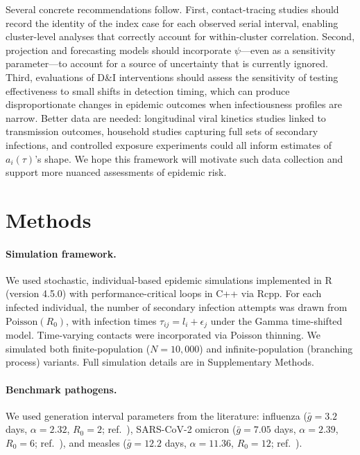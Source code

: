 \documentclass[10pt]{article}
\begin{document}
Several concrete recommendations follow. First, contact-tracing studies should record the identity of the index case for each observed serial interval, enabling cluster-level analyses that correctly account for within-cluster correlation. Second, projection and forecasting models should incorporate $\psi$---even as a sensitivity parameter---to account for a source of uncertainty that is currently ignored. Third, evaluations of D\&I interventions should assess the sensitivity of testing effectiveness to small shifts in detection timing, which can produce disproportionate changes in epidemic outcomes when infectiousness profiles are narrow. Better data are needed: longitudinal viral kinetics studies linked to transmission outcomes, household studies capturing full sets of secondary infections, and controlled exposure experiments could all inform estimates of $a_i(\tau)$'s shape. We hope this framework will motivate such data collection and support more nuanced assessments of epidemic risk.


\section{Methods}

\paragraph{Simulation framework.}
We used stochastic, individual-based epidemic simulations implemented in R (version 4.5.0) with performance-critical loops in C++ via Rcpp. For each infected individual, the number of secondary infection attempts was drawn from $\text{Poisson}(R_0)$, with infection times $\tau_{ij} = l_i + \epsilon_j$ under the Gamma time-shifted model. Time-varying contacts were incorporated via Poisson thinning. We simulated both finite-population ($N = 10{,}000$) and infinite-population (branching process) variants. Full simulation details are in Supplementary Methods.

\paragraph{Benchmark pathogens.}
We used generation interval parameters from the literature: influenza ($\bar{g} = 3.2$ days, $\alpha = 2.32$, $R_0 = 2$; ref.~), SARS-CoV-2 omicron ($\bar{g} = 7.05$ days, $\alpha = 2.39$, $R_0 = 6$; ref.~), and measles ($\bar{g} = 12.2$ days, $\alpha = 11.36$, $R_0 = 12$; ref.~).
\end{document}

